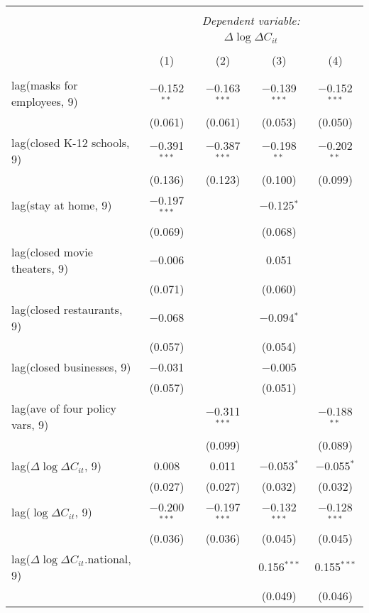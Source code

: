 \begin{tabular}{@{\extracolsep{1pt}}lcccc} 
\\[-1.8ex]\hline 
\hline \\[-1.8ex] 
 & \multicolumn{4}{c}{\textit{Dependent variable:}} \\ 
\cline{2-5} 
 & \multicolumn{4}{c}{$\Delta \log \Delta C_{it}$} \\ 
\\[-1.8ex] & (1) & (2) & (3) & (4)\\ 
\hline \\[-1.8ex] 
 lag(masks for employees, 9) & $-$0.152$^{**}$ & $-$0.163$^{***}$ & $-$0.139$^{***}$ & $-$0.152$^{***}$ \\ 
  & (0.061) & (0.061) & (0.053) & (0.050) \\ 
  lag(closed K-12 schools, 9) & $-$0.391$^{***}$ & $-$0.387$^{***}$ & $-$0.198$^{**}$ & $-$0.202$^{**}$ \\ 
  & (0.136) & (0.123) & (0.100) & (0.099) \\ 
  lag(stay at home, 9) & $-$0.197$^{***}$ &  & $-$0.125$^{*}$ &  \\ 
  & (0.069) &  & (0.068) &  \\ 
  lag(closed movie theaters, 9) & $-$0.006 &  & 0.051 &  \\ 
  & (0.071) &  & (0.060) &  \\ 
  lag(closed restaurants, 9) & $-$0.068 &  & $-$0.094$^{*}$ &  \\ 
  & (0.057) &  & (0.054) &  \\ 
  lag(closed businesses, 9) & $-$0.031 &  & $-$0.005 &  \\ 
  & (0.057) &  & (0.051) &  \\ 
  lag(ave of four policy vars, 9) &  & $-$0.311$^{***}$ &  & $-$0.188$^{**}$ \\ 
  &  & (0.099) &  & (0.089) \\ 
  lag($\Delta \log \Delta C_{it}$, 9) & 0.008 & 0.011 & $-$0.053$^{*}$ & $-$0.055$^{*}$ \\ 
  & (0.027) & (0.027) & (0.032) & (0.032) \\ 
  lag($\log \Delta C_{it}$, 9) & $-$0.200$^{***}$ & $-$0.197$^{***}$ & $-$0.132$^{***}$ & $-$0.128$^{***}$ \\ 
  & (0.036) & (0.036) & (0.045) & (0.045) \\ 
  lag($\Delta \log \Delta C_{it}$.national, 9) &  &  & 0.156$^{***}$ & 0.155$^{***}$ \\ 
  &  &  & (0.049) & (0.046) \\ 

\end{tabular}
